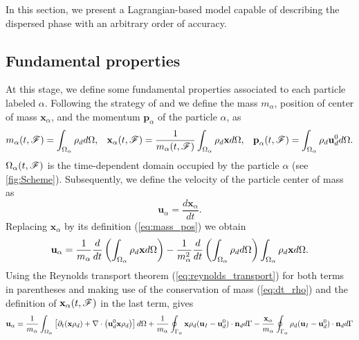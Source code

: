 
In this section, we present a Lagrangian-based model capable of describing the dispersed phase with an arbitrary order of accuracy.

\subsection{Fundamental properties}

At this stage, we define some fundamental properties associated to each particle labeled $\alpha$.
Following the strategy of \citet{lhuillier2009rheology,lhuillier1992volume,zaepffel2011modelisation} and \citet[Chapter 2]{morel2015mathematical}
we define the mass $m_\alpha$, position of center of mass $\mathbf{x}_\alpha$, and the momentum $\textbf{p}_\alpha$ of the particle $\alpha$, as
\begin{align}
    m_\alpha(t,\mathscr{F})
    = \int_{\Omega_\alpha}  \rho_d   d\Omega, 
    &&
    \textbf{x}_\alpha(t,\mathscr{F})
    = \frac{1}{m_\alpha(t,\mathscr{F}) }\int_{\Omega_\alpha}  \rho_d \textbf{x}  d\Omega, 
    &&\textbf{p}_\alpha(t,\mathscr{F}) 
    = \int_{\Omega_\alpha}  \rho_d \textbf{u}_d^0  d\Omega.
    \label{eq:mass_pos}
\end{align}
$\Omega_\alpha(t,\mathscr{F})$ is the time-dependent domain occupied by the particle $\alpha$ (see \ref{fig:Scheme}). 
Subsequently, we define the velocity of the particle center of mass as
\begin{equation*}
\textbf{u}_\alpha = \frac{d \textbf{x}_\alpha}{dt}.
\end{equation*}
Replacing $\textbf{x}_\alpha$ by its definition (\ref{eq:mass_pos}) we obtain
\begin{equation*}
    \textbf{u}_\alpha = \frac{1}{m_\alpha}
    \frac{d}{dt} 
    \left(
        \int_{\Omega_\alpha}  \rho_d \textbf{x}  d\Omega
    \right)
    - \frac{1}{m_\alpha^2} \frac{d}{dt} \left(\int_{\Omega_\alpha}  \rho_d  d\Omega \right)
    \int_{\Omega_\alpha}  \rho_d \textbf{x}  d\Omega.
\end{equation*}
Using the Reynolds transport theorem (\ref{eq:reynolds_transport}) for both terms in parentheses and making use of the conservation of mass (\ref{eq:dt_rho}) and the definition of $\textbf{x}_\alpha(t,\mathscr{F})$ in the last term, gives
\begin{equation}
    \textbf{u}_\alpha = 
    \frac{1}{m_\alpha}\int_{\Omega_\alpha}  \left[
        \partial_t (\textbf{x}\rho_d ) + \mathbf{\nabla}\cdot\left(\textbf{u}_d^0 \textbf{x} \rho_d\right) 
    \right] d\Omega \\
    + \frac{1}{m_\alpha}\oint_{\Gamma_\alpha}  \textbf{x} \rho_d(\textbf{u}_I   - \textbf{u}_d^0) \cdot \textbf{n}_d  d\Gamma
    -  \frac{\textbf{x}_\alpha}{m_\alpha}    \oint_{\Gamma_\alpha}  \rho_d(\textbf{u}_I   - \textbf{u}_d^0) \cdot \textbf{n}_d  d\Gamma
\end{equation}
